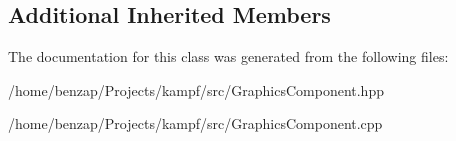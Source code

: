 \subsection*{Additional Inherited Members}


The documentation for this class was generated from the following files\-:\begin{DoxyCompactItemize}
\item 
/home/benzap/\-Projects/kampf/src/Graphics\-Component.\-hpp\item 
/home/benzap/\-Projects/kampf/src/Graphics\-Component.\-cpp\end{DoxyCompactItemize}
